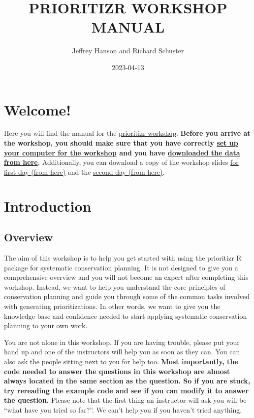 \documentclass[
  12pt,
]{book}
\title{PRIORITIZR WORKSHOP MANUAL}
\author{Jeffrey Hanson and Richard Schuster}
\date{2023-04-13}
\begin{document}
\maketitle

{
\hypersetup{linkcolor=}
\setcounter{tocdepth}{0}
\tableofcontents
}
\hypertarget{welcome}{%
\chapter{Welcome!}\label{welcome}}

Here you will find the manual for the \href{https://prioritizr.github.io/workshop/}{prioritizr workshop}. \textbf{Before you arrive at the workshop, you should make sure that you have correctly \protect\hyperlink{setup}{set up your computer for the workshop} and you have \href{https://github.com/prioritizr/workshop/raw/main/data.zip}{downloaded the data from here}.} Additionally, you can download a copy of the workshop slides \href{https://github.com/prioritizr/workshop/raw/main/slides-day-1.pptx}{for first day (from here)} and the \href{https://github.com/prioritizr/workshop/raw/main/slides-day-2.pptx}{second day (from here)}.

\hypertarget{introduction}{%
\chapter{Introduction}\label{introduction}}

\hypertarget{overview}{%
\section{Overview}\label{overview}}

The aim of this workshop is to help you get started with using the prioritizr R package for systematic conservation planning. It is not designed to give you a comprehensive overview and you will not become an expert after completing this workshop. Instead, we want to help you understand the core principles of conservation planning and guide you through some of the common tasks involved with generating prioritizations. In other words, we want to give you the knowledge base and confidence needed to start applying systematic conservation planning to your own work.

You are not alone in this workshop. If you are having trouble, please put your hand up and one of the instructors will help you as soon as they can. You can also ask the people sitting next to you for help too. \textbf{Most importantly, the code needed to answer the questions in this workshop are almost always located in the same section as the question. So if you are stuck, try rereading the example code and see if you can modify it to answer the question.} Please note that the first thing an instructor will ask you will be ``what have you tried so far?''. We can't help you if you haven't tried anything.
\end{document}
